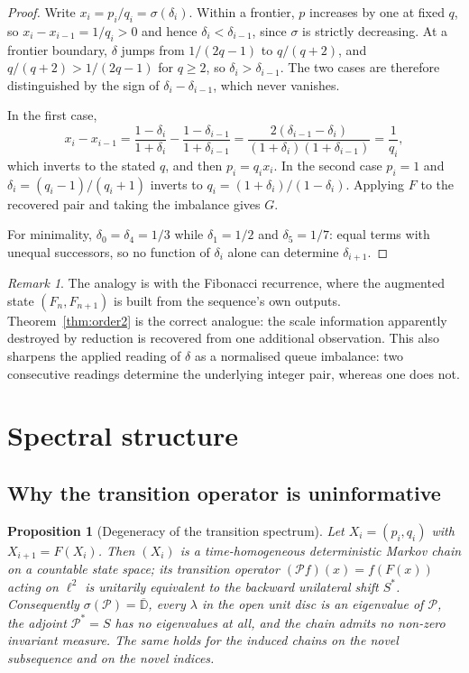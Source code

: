 \documentclass[11pt,a4paper]{article}
\theoremstyle{plain}
\newtheorem{proposition}[theorem]{Proposition}
\theoremstyle{definition}
\theoremstyle{remark}
\newtheorem{remark}[theorem]{Remark}
\begin{document}
\begin{proof}
Write $x_i = p_i/q_i = \sigma(\delta_i)$. Within a frontier, $p$ increases by
one at fixed $q$, so $x_i - x_{i-1} = 1/q_i > 0$ and hence
$\delta_i < \delta_{i-1}$, since $\sigma$ is strictly decreasing. At a frontier
boundary, $\delta$ jumps from $1/(2q-1)$ to $q/(q+2)$, and
$q/(q+2) > 1/(2q-1)$ for $q \ge 2$, so $\delta_i > \delta_{i-1}$. The two cases
are therefore distinguished by the sign of $\delta_i - \delta_{i-1}$, which
never vanishes.

In the first case,
\[
  x_i - x_{i-1}
  = \frac{1-\delta_i}{1+\delta_i} - \frac{1-\delta_{i-1}}{1+\delta_{i-1}}
  = \frac{2(\delta_{i-1}-\delta_i)}{(1+\delta_i)(1+\delta_{i-1})}
  = \frac{1}{q_i},
\]
which inverts to the stated $q$, and then $p_i = q_i x_i$. In the second case
$p_i = 1$ and $\delta_i = (q_i-1)/(q_i+1)$ inverts to $q_i = (1+\delta_i)/(1-\delta_i)$.
Applying $F$ to the recovered pair and taking the imbalance gives $G$.

For minimality, $\delta_0 = \delta_4 = 1/3$ while $\delta_1 = 1/2$ and
$\delta_5 = 1/7$: equal terms with unequal successors, so no function of
$\delta_i$ alone can determine $\delta_{i+1}$.
\end{proof}

\begin{remark}
The analogy is with the Fibonacci recurrence, where the augmented state
$(F_n, F_{n+1})$ is built from the sequence's own outputs. Theorem~\ref{thm:order2}
is the correct analogue: the scale information apparently destroyed by reduction
is recovered from one additional observation. This also sharpens the applied
reading of $\delta$ as a normalised queue imbalance: two consecutive readings
determine the underlying integer pair, whereas one does not.
\end{remark}

\section{Spectral structure}
\label{sec:spectral}

\subsection{Why the transition operator is uninformative}

\begin{proposition}[Degeneracy of the transition spectrum]\label{prop:degenerate}
Let $X_i = (p_i,q_i)$ with $X_{i+1} = F(X_i)$. Then $(X_i)$ is a
time-homogeneous deterministic Markov chain on a countable state space; its
transition operator $(\mathcal{P}f)(x) = f(F(x))$ acting on $\ell^2$ is
unitarily equivalent to the \emph{backward} unilateral shift $S^*$.
Consequently $\sigma(\mathcal{P}) = \overline{\mathbb{D}}$, every
$\lambda$ in the open unit disc is an eigenvalue of $\mathcal{P}$, the adjoint
$\mathcal{P}^* = S$ has no eigenvalues at all, and the chain admits no non-zero
invariant measure. The same holds for the induced chains on the novel
subsequence and on the novel indices.
\end{proposition}
\end{document}
